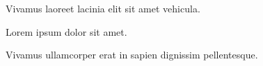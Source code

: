 




\begin{abstracts}        %

Vivamus laoreet lacinia elit sit amet vehicula.

\end{abstracts}

\begin{resumen}        %

Lorem ipsum dolor sit amet.


\end{resumen}


\begin{laburpena}        %


Vivamus ullamcorper erat in sapien dignissim pellentesque.


\end{laburpena}




